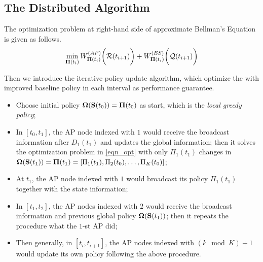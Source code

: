 \subsection{The Distributed Algorithm}

The optimization problem at right-hand side of approximate Bellman's Equation is given as follows.
\begin{align}
    \min_{\boldsymbol{\Pi}(t_i)} W^{(AP)}_{\boldsymbol{\Pi}(t_i)}\bigg(\mathcal{R}(t_{i+1})\bigg) + W^{(ES)}_{\boldsymbol{\Pi}(t_i)}\bigg(\mathcal{Q}(t_{i+1})\bigg)
    \label{eqn_opt}
\end{align}

Then we introduce the iterative policy update algorithm, which optimize the 
with improved baseline policy in each interval as performance guarantee.
\begin{itemize}
    \item Choose initial policy $\boldsymbol{\Omega}(\mathbf{S}(t_0)) = \boldsymbol{\Pi}(t_0)$ as start, which is the \emph{local greedy policy};
    \item In $[t_0, t_1]$, the AP node indexed with $1$ would receive the broadcast information after $D_1(t_1)$ and updates the global information; then it solves the optimization problem in \ref{eqn_opt} with only $\Pi_{1}(t_1)$ changes in $\boldsymbol{\Omega}(\mathbf{S}(t_1)) = \boldsymbol{\Pi}(t_1) = [\Pi_{1}(t_1), \Pi_{2}(t_0), \dots, \Pi_{K}(t_0)]$;
    \item At $t_1$, the AP node indexed with $1$ would broadcast its policy $\Pi_{1}(t_1)$ together with the state information;
    \item In $[t_1, t_2]$, the AP nodes indexed with $2$ would receive the broadcast information and previous global policy $\boldsymbol{\Omega}(\mathbf{S}(t_1))$; then it repeats the procedure what the $1$-st AP did;
    \item Then generally, in $[t_{i}, t_{i+1}]$, the AP nodes indexed with $(k \mod K)+1$ would update its own policy following the above procedure.
\end{itemize}

